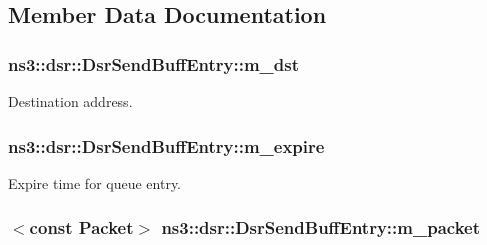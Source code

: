 \subsection{Member Data Documentation}
\subsubsection[{\texorpdfstring{m\+\_\+dst}{m_dst}}]{ ns3\+::dsr\+::\+Dsr\+Send\+Buff\+Entry\+::m\+\_\+dst\hspace{0.3cm}{\ttfamily [private]}}\hypertarget{classns3_1_1dsr_1_1DsrSendBuffEntry_a2b36d0bcffbe657d1a302c95c687895b}{}\label{classns3_1_1dsr_1_1DsrSendBuffEntry_a2b36d0bcffbe657d1a302c95c687895b}


Destination address. 

\subsubsection[{\texorpdfstring{m\+\_\+expire}{m_expire}}]{ ns3\+::dsr\+::\+Dsr\+Send\+Buff\+Entry\+::m\+\_\+expire\hspace{0.3cm}{\ttfamily [private]}}\hypertarget{classns3_1_1dsr_1_1DsrSendBuffEntry_aabe31d1a945201779003637b7925d20b}{}\label{classns3_1_1dsr_1_1DsrSendBuffEntry_aabe31d1a945201779003637b7925d20b}


Expire time for queue entry. 

\subsubsection[{\texorpdfstring{m\+\_\+packet}{m_packet}}]{$<$const {\bf Packet}$>$ ns3\+::dsr\+::\+Dsr\+Send\+Buff\+Entry\+::m\+\_\+packet\hspace{0.3cm}{\ttfamily [private]}}\hypertarget{classns3_1_1dsr_1_1DsrSendBuffEntry_a2e375746029ba88a98d331f23307f7f2}{}\label{classns3_1_1dsr_1_1DsrSendBuffEntry_a2e375746029ba88a98d331f23307f7f2}


